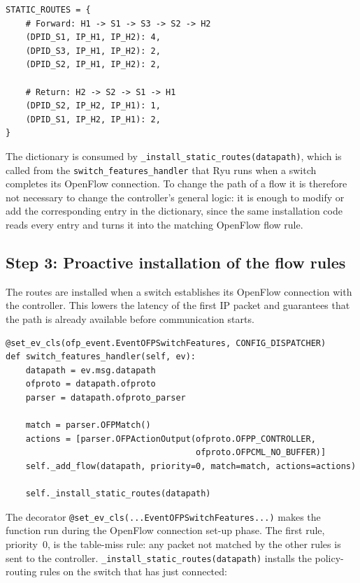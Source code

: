 \documentclass[11pt,a4paper]{article}
\newcommand{\code}[1]{\texttt{#1}}
\begin{document}
\begin{lstlisting}[style=py,caption={Asymmetric static routing policy}]
STATIC_ROUTES = {
    # Forward: H1 -> S1 -> S3 -> S2 -> H2
    (DPID_S1, IP_H1, IP_H2): 4,
    (DPID_S3, IP_H1, IP_H2): 2,
    (DPID_S2, IP_H1, IP_H2): 2,

    # Return: H2 -> S2 -> S1 -> H1
    (DPID_S2, IP_H2, IP_H1): 1,
    (DPID_S1, IP_H2, IP_H1): 2,
}
\end{lstlisting}

The dictionary is consumed by \code{\_install\_static\_routes(datapath)}, which
is called from the \code{switch\_features\_handler} that Ryu runs when a switch
completes its OpenFlow connection. To change the path of a flow it is therefore
not necessary to change the controller's general logic: it is enough to modify
or add the corresponding entry in the dictionary, since the same installation
code reads every entry and turns it into the matching OpenFlow flow rule.

\subsection{Step 3: Proactive installation of the flow rules}
The routes are installed when a switch establishes its OpenFlow connection with
the controller. This lowers the latency of the first IP packet and guarantees
that the path is already available before communication starts.

\begin{lstlisting}[style=py,caption={Installing the table-miss rule and the static routes}]
@set_ev_cls(ofp_event.EventOFPSwitchFeatures, CONFIG_DISPATCHER)
def switch_features_handler(self, ev):
    datapath = ev.msg.datapath
    ofproto = datapath.ofproto
    parser = datapath.ofproto_parser

    match = parser.OFPMatch()
    actions = [parser.OFPActionOutput(ofproto.OFPP_CONTROLLER,
                                      ofproto.OFPCML_NO_BUFFER)]
    self._add_flow(datapath, priority=0, match=match, actions=actions)

    self._install_static_routes(datapath)
\end{lstlisting}

The decorator \code{@set\_ev\_cls(...EventOFPSwitchFeatures...)} makes the
function run during the OpenFlow connection set-up phase. The first rule,
priority~0, is the table-miss rule: any packet not matched by the other rules is
sent to the controller. \code{\_install\_static\_routes(datapath)} installs the
policy-routing rules on the switch that has just connected:
\end{document}
